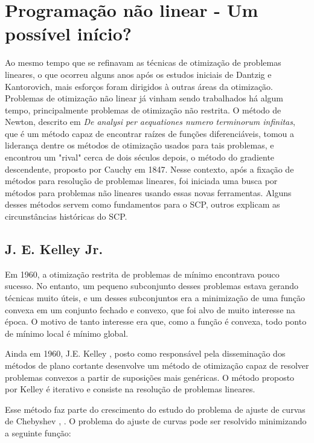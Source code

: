 \section{Programação não linear - Um possível início?}
\label{secao_historia}

\noindent
Ao mesmo tempo que se refinavam as técnicas de otimização de problemas lineares, o que ocorreu
alguns anos após os estudos iniciais de Dantzig e Kantorovich, mais esforços foram dirigidos à
outras áreas da otimização. Problemas de otimização não linear já vinham sendo trabalhados
há algum tempo, principalmente problemas de otimização não restrita. O método de Newton, descrito
em \textit{De analysi per aequationes numero terminorum infinitas}, que é um método capaz de encontrar
raízes de funções diferenciáveis, tomou a liderança dentre os métodos de otimização usados para
tais problemas, e encontrou um "rival" cerca de dois séculos depois, o método do gradiente
descendente, proposto por Cauchy \cite{lemarechal2012cauchy} em 1847. Nesse contexto, após
a fixação de métodos para resolução de problemas lineares, foi iniciada uma busca por métodos para
problemas não lineares usando essas novas ferramentas. Alguns desses métodos servem como fundamentos
para o SCP, outros explicam as circunstâncias históricas do SCP.

\subsection{J. E. Kelley Jr.}

\noindent
Em 1960, a otimização restrita de problemas de mínimo encontrava pouco sucesso. No
entanto, um pequeno subconjunto desses problemas estava gerando técnicas muito úteis, e um desses
subconjuntos era a minimização de uma função convexa em um conjunto fechado e convexo, que foi
alvo de muito interesse na época. O motivo de tanto interesse era que, como a função é convexa,
todo ponto de mínimo local é mínimo global.

Ainda em 1960, J.E. Kelley \cite{kelley1960cutting}, posto como responsável pela disseminação dos
métodos de plano cortante desenvolve um método de otimização capaz de resolver problemas convexos
a partir de suposições mais genéricas. O método proposto por Kelley é iterativo e consiste na
resolução de problemas lineares.

Esse método faz parte do crescimento do estudo do problema de ajuste de curvas de Chebyshev
\cite{kelley1959computational}, \cite{kelley1958application}. O problema do ajuste de curvas pode
ser resolvido minimizando a seguinte função:

